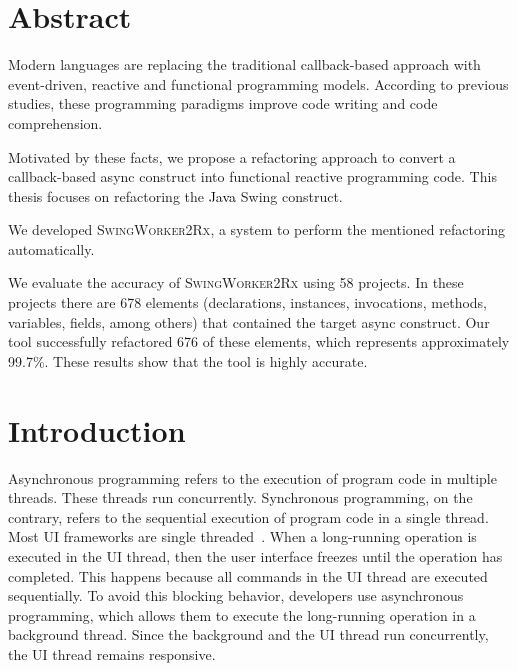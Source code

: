 \documentclass[type=bsc,accentcolor=tud9c]{tudthesis}
\newcommand{\framework}[1]{\textcolor{black}{#1}}
\newcommand{\toolextension}{\textsc{SwingWorker2Rx}}
\begin{document}

\author{Grebiel José Ifill Brito}
\date{February 2017}

\makethesistitle

\chapter*{Abstract}
Modern languages are replacing the traditional callback-based approach with event-driven, reactive and functional programming models. According to previous studies, these programming paradigms improve code writing and code comprehension.

Motivated by these facts, we propose a refactoring approach to convert a callback-based async construct into functional reactive programming code. This thesis focuses on refactoring the  \framework{Java} Swing construct.

We developed \toolextension{}, a system to perform the mentioned refactoring automatically.

We evaluate the accuracy of \toolextension{} using 58 projects. In these projects there are 678 elements (declarations, instances, invocations, methods, variables, fields, among others) that contained the target async construct. Our tool successfully refactored 676 of these elements, which represents approximately 99.7\%. These results show that the tool is highly accurate.

\tableofcontents
\listoffigures
\listoftables
\listoflistings


\chapter{Introduction}
\label{chapter:introduction}
Asynchronous programming refers to the execution of program code in multiple threads. These threads run concurrently. Synchronous programming, on the contrary, refers to the sequential execution of program code in a single thread. Most UI frameworks are single threaded~\cite{uiSingleThreaded}. When a long-running operation is executed in the UI thread, then the user interface freezes until the operation has completed. This happens because all commands in the UI thread are executed sequentially. To avoid this blocking behavior, developers use asynchronous programming, which allows them to execute the long-running operation in a background thread. Since the background and the UI thread run concurrently, the UI thread remains responsive.
\end{document}
